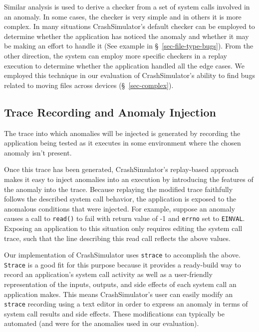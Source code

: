     Similar analysis is used to derive a checker from a set of system calls
    involved in an anomaly.
    In some cases, %
    the checker is very simple and in others it is more complex.
    In many situations
    CrashSimulator's default checker can be employed to determine
    whether the application has noticed the anomaly and whether it may be making
    an effort to handle it (See example in
    \S~\ref{sec-file-type-bugs}).  From the other direction,
    the system can employ more specific checkers in a replay execution 
    to determine whether the application handled
    all the edge cases.  We employed this technique in our
    evaluation of CrashSimulator's ability to find bugs related to moving files across
    devices (\S~\ref{sec-complex}).
    
    \subsection{Trace Recording and Anomaly Injection}

    The trace into which anomalies will be injected is generated by recording
    the application being tested as it executes in some environment where the
    chosen anomaly isn't present.

    Once this trace has been generated,
    CrashSimulator's replay-based approach makes it easy to inject anomalies
    into an execution by introducing the features of the
    anomaly into the trace.
    Because replaying the modified trace faithfully
    follows the described system call behavior, the application is exposed to
    the anomalous conditions that were injected.
    For example, suppose an anomaly causes a
    call to {\tt read()} to fail with return value of -1 and {\tt errno} set to
    {\tt EINVAL}.  Exposing an application to this situation only requires
    editing the system call trace, such that the line describing this read call
    reflects the above values.

    Our implementation of CrashSimulator uses {\tt strace} to accomplish the
    above.  {\tt Strace} is a good fit for this purpose because it provides a
    ready-build way to record an application's system call activity as well as a
    user-friendly representation of the inputs, outputs, and side effects of
    each system call an application makes.  This means CrashSimulator's user can
    easily modify an {\tt strace} recording using a text editor in order to
    express an anomaly in terms of system call results and side effects.  These
    modifications can typically be automated (and were for the anomalies used in
    our evaluation).


